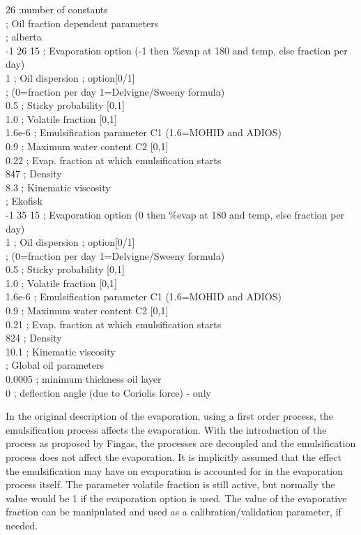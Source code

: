 \documentclass[english]{deltares_manual}
\begin{document}
\begin{tcolorbox}
26 ;number of constants \\
; Oil fraction dependent parameters\\
; alberta\\
-1  26 15        ; Evaporation option (-1 then \%evap at 180 and temp, else fraction per day)\\
1               ; Oil dispersion ; option[0/1] \\
; (0=fraction per day 1=Delvigne/Sweeny formula)\\
0.5               ; Sticky probability [0,1]\\
1.0               ; Volatile fraction [0,1]\\
1.6e-6               ; Emulsification parameter C1 (1.6=MOHID and ADIOS)\\
0.9               ; Maximum water content C2  [0,1]\\
0.22               ; Evap. fraction at which emulsification starts\\
847               ; Density \\
8.3               ; Kinematic viscosity \\
; Ekofisk \\
-1 35 15        ; Evaporation option (0 then \%evap at 180 and temp, else fraction per day)\\
1               ; Oil dispersion ; option[0/1] \\
; (0=fraction per day 1=Delvigne/Sweeny formula)\\
0.5               ; Sticky probability [0,1]\\
1.0               ; Volatile fraction [0,1]\\
1.6e-6               ; Emulsification parameter C1 (1.6=MOHID and ADIOS)\\
0.9               ; Maximum water content C2  [0,1]\\
0.21               ; Evap. fraction at which emulsification starts\\
824               ; Density \\
10.1               ; Kinematic viscosity \\
; Global oil parameters\\
0.0005               ; minimum thickness oil layer\\
0               ; deflection angle (due to Coriolis force) - only
\end{tcolorbox}

In the original description of the evaporation, using a first order process, the emulsification process affects the evaporation. With the introduction of the process as proposed by Fingas, the processes are decoupled and the emulsification process does not affect the evaporation. It is implicitly assumed that the effect the emulsification may have on evaporation is accounted for in the evaporation process itself. The parameter volatile fraction is still active, but normally the value would be 1 if the evaporation option is used. The value of the evaporative fraction can be manipulated and used as a calibration/validation parameter, if needed. 
\end{document}
